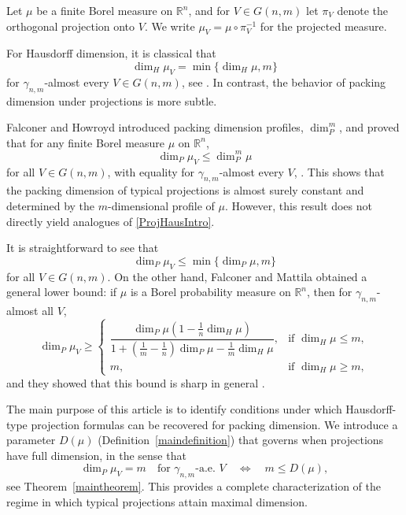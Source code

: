 \documentclass[12pt]{amsart}
\theoremstyle{definition}
\theoremstyle{remark}
\numberwithin{equation}{section}
\begin{document}
Let $\mu$ be a finite Borel measure on $\mathbb{R}^n$, and for $V\in G(n,m)$ let $\pi_V$ denote the orthogonal projection onto $V$. We write $\mu_V=\mu\circ \pi_V^{-1}$ for the projected measure.

For Hausdorff dimension, it is classical that
\begin{equation}\label{ProjHausIntro}
\dim_H \mu_V=\min\{\dim_H\mu,m\}
\end{equation}
for $\gamma_{n,m}$-almost every $V\in G(n,m)$, see \cite{hu1994fractal}. In contrast, the behavior of packing dimension under projections is more subtle.

Falconer and Howroyd introduced packing dimension profiles, $\dim_P^m$, and proved that for any finite Borel measure $\mu$ on $\mathbb{R}^n$,
\[
\dim_P \mu_V\le \dim_P^m \mu
\]
for all $V\in G(n,m)$, with equality for $\gamma_{n,m}$-almost every $V$, \cite{falconer1997packing}. This shows that the packing dimension of typical projections is almost surely constant and determined by the $m$-dimensional profile of $\mu$. However, this result does not directly yield analogues of \eqref{ProjHausIntro}.

It is straightforward to see that
\[
\dim_P \mu_V \le \min\{\dim_P\mu,m\}
\]
for all $V\in G(n,m)$. On the other hand, Falconer and Mattila obtained a general lower bound: if $\mu$ is a Borel probability measure on $\mathbb{R}^n$, then for $\gamma_{n,m}$-almost all $V$,
\[
\dim_P \mu_V \ge 
\begin{cases}
\dfrac{\dim_P \mu\left(1-\frac{1}{n}\dim_H \mu\right)}
{1+\left(\frac{1}{m}-\frac{1}{n}\right)\dim_P \mu-\frac{1}{m}\dim_H \mu},
& \text{if } \dim_H \mu \le m, \\[1.2em]
m, & \text{if } \dim_H \mu \ge m,
\end{cases}
\]
and they showed that this bound is sharp in general \cite{falconer1996packing}.

The main purpose of this article is to identify conditions under which Hausdorff-type projection formulas can be recovered for packing dimension. We introduce a parameter $D(\mu)$ (Definition~\ref{maindefinition}) that governs when projections have full dimension, in the sense that
\[
\dim_P \mu_V = m \quad \text{for } \gamma_{n,m}\text{-a.e. }V
\quad \Longleftrightarrow \quad
m\le D(\mu),
\]
see Theorem~\ref{maintheorem}. This provides a complete characterization of the regime in which typical projections attain maximal dimension.
\end{document}
